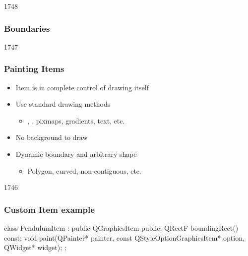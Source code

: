 
\begin{slide}{1748}

\frametitle{Boundaries}
\end{slide}



\begin{slide}{1747}

\frametitle{Painting Items}
\begin{itemize}
\item Item is in complete control of drawing itself
\item Use standard  drawing methods

    \begin{itemize}
    \item {}, , pixmaps, gradients, text, etc. 

    \end{itemize}
\item No background to draw

\item Dynamic boundary and arbitrary shape
    \begin{itemize}
    \item Polygon, curved, non-contiguous, etc. 
    \end{itemize}
\end{itemize}

\end{slide}




\begin{slide}[fragile]{1746}


\frametitle{Custom Item example}
\begin{cpp}

class PendulumItem : public QGraphicsItem {
public:
    QRectF boundingRect() const;
    void paint(QPainter* painter,
               const QStyleOptionGraphicsItem* option,
               QWidget* widget);
};

\end{cpp}
\begin{columns}[t]
\begin{column}{10mm}
\end{column}
\begin{column}{10mm}
\end{column}
\end{columns}
\end{slide}


